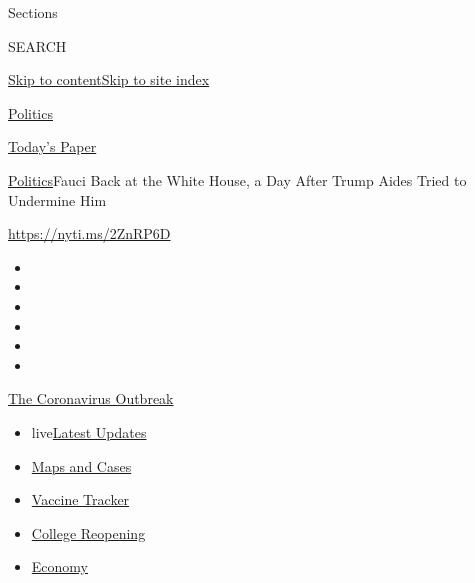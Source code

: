 Sections

SEARCH

\protect\hyperlink{site-content}{Skip to
content}\protect\hyperlink{site-index}{Skip to site index}

\href{https://www.nytimes.com/section/politics}{Politics}

\href{https://myaccount.nytimes.com/auth/login?response_type=cookie\&client_id=vi}{}

\href{https://www.nytimes.com/section/todayspaper}{Today's Paper}

\href{/section/politics}{Politics}\textbar{}Fauci Back at the White
House, a Day After Trump Aides Tried to Undermine Him

\url{https://nyti.ms/2ZnRP6D}

\begin{itemize}
\item
\item
\item
\item
\item
\item
\end{itemize}

\href{https://www.nytimes.com/news-event/coronavirus?action=click\&pgtype=Article\&state=default\&region=TOP_BANNER\&context=storylines_menu}{The
Coronavirus Outbreak}

\begin{itemize}
\tightlist
\item
  live\href{https://www.nytimes.com/2020/08/03/world/coronavirus-covid-19.html?action=click\&pgtype=Article\&state=default\&region=TOP_BANNER\&context=storylines_menu}{Latest
  Updates}
\item
  \href{https://www.nytimes.com/interactive/2020/us/coronavirus-us-cases.html?action=click\&pgtype=Article\&state=default\&region=TOP_BANNER\&context=storylines_menu}{Maps
  and Cases}
\item
  \href{https://www.nytimes.com/interactive/2020/science/coronavirus-vaccine-tracker.html?action=click\&pgtype=Article\&state=default\&region=TOP_BANNER\&context=storylines_menu}{Vaccine
  Tracker}
\item
  \href{https://www.nytimes.com/2020/08/02/us/covid-college-reopening.html?action=click\&pgtype=Article\&state=default\&region=TOP_BANNER\&context=storylines_menu}{College
  Reopening}
\item
  \href{https://www.nytimes.com/live/2020/08/03/business/stock-market-today-coronavirus?action=click\&pgtype=Article\&state=default\&region=TOP_BANNER\&context=storylines_menu}{Economy}
\end{itemize}

